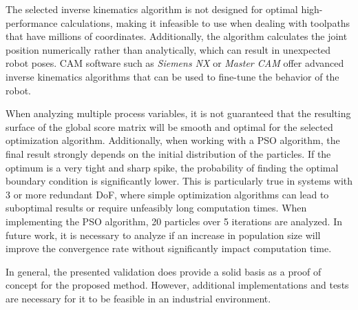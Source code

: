 The selected inverse kinematics algorithm is not designed for optimal high-performance calculations, making it infeasible to use when dealing with toolpaths that have millions of coordinates. Additionally, the algorithm calculates the joint position numerically rather than analytically, which can result in unexpected robot poses. \acrshort{CAM} software such as \textit{Siemens NX} or \textit{Master CAM} offer advanced inverse kinematics algorithms that can be used to fine-tune the behavior of the robot.

When analyzing multiple process variables, it is not guaranteed that the resulting surface of the global score matrix will be smooth and optimal for the selected optimization algorithm. Additionally, when working with a \acrshort{PSO} algorithm, the final result strongly depends on the initial distribution of the particles. If the optimum is a very tight and sharp spike, the probability of finding the optimal boundary condition is significantly lower. This is particularly true in systems with 3 or more redundant \acrshort{DoF}, where simple optimization algorithms can lead to suboptimal results or require unfeasibly long computation times. When implementing the \acrshort{PSO} algorithm, 20 particles over 5 iterations are analyzed. In future work, it is necessary to analyze if an increase in population size will improve the convergence rate without significantly impact computation time. 


In general, the presented validation does provide a solid basis as a proof of concept for the proposed method. However, additional implementations and tests are necessary for it to be feasible in an industrial environment.
